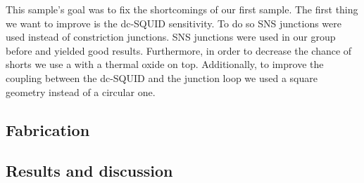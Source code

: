 This sample's goal was to fix the shortcomings of our first sample. The first thing we want to improve is the dc-SQUID sensitivity. To do so SNS junctions were used instead of constriction junctions. SNS junctions were used in our group before and yielded good results.\cite{rogSQUIDontipMagneticMicroscopy2022} Furthermore, in order to decrease the chance of shorts we use a  with a thermal oxide on top. Additionally, to improve the coupling between the dc-SQUID and the junction loop we used a square geometry instead of a circular one. 

\subsection{Fabrication}
\label{sec:CP2.6B-fabrication}


\subsection{Results and discussion}
